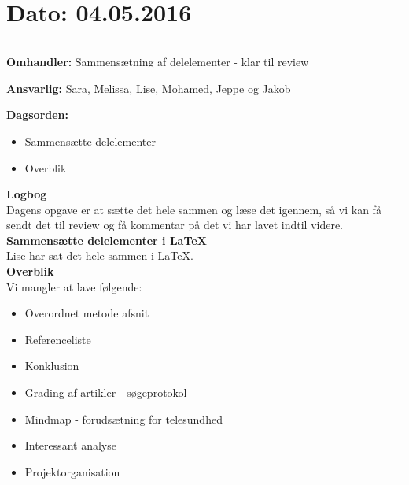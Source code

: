 \section{Dato: 04.05.2016}
\hrule

\textbf{Omhandler:} Sammensætning af delelementer - klar til review

\textbf{Ansvarlig:} Sara, Melissa, Lise, Mohamed, Jeppe og Jakob

\textbf{Dagsorden:}
\begin{itemize}
	\item Sammensætte delelementer
	\item Overblik
\end{itemize}

\textbf{Logbog}
\\
Dagens opgave er at sætte det hele sammen og læse det igennem, så vi kan få sendt det til review og få kommentar på det vi har lavet indtil videre.
\\

\textbf{Sammensætte delelementer i LaTeX}
\\
Lise har sat det hele sammen i LaTeX.
\\

\textbf{Overblik}
\\
Vi mangler at lave følgende:
\begin{itemize}
	\item Overordnet metode afsnit
	\item Referenceliste
	\item Konklusion
	\item Grading af artikler - søgeprotokol
	\item Mindmap - forudsætning for telesundhed
	\item Interessant analyse
	\item Projektorganisation
\end{itemize}
\\

